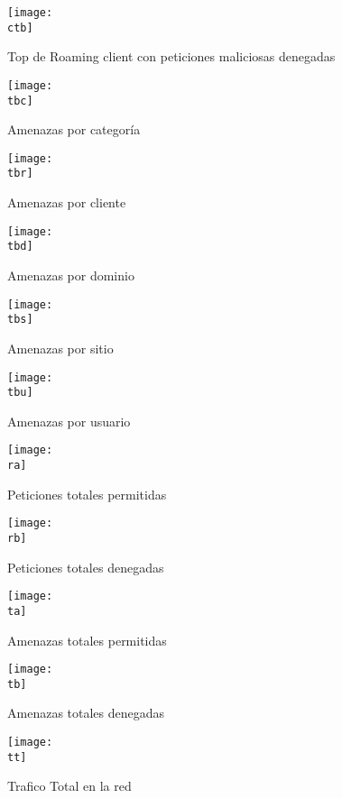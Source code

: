 \documentclass[a4paper]{article}
\newcommand{\ctb}{img/client-threat-block.png}
\newcommand{\tbc}{img/threats-category.pdf}
\newcommand{\tbd}{img/threats-domain.pdf}
\newcommand{\tbr}{img/threats-client.pdf}
\newcommand{\tbs}{img/threats-site.pdf}
\newcommand{\tbu}{img/threats-user.pdf}
\newcommand{\ra}{img/requestAllow.png}
\newcommand{\rb}{img/requestBlock.png}
\newcommand{\ta}{img/threatAllow.png}
\newcommand{\tb}{img/threatBlock.png}
\newcommand{\tt}{img/traficoTotal.png}
\begin{document}
    \begin{figure}[H]
        \centering
        \texttt{[image: \\ctb]}
        \caption{Top de Roaming client con peticiones maliciosas denegadas}
    \end{figure}

    \begin{figure}[H]
        \centering
        \texttt{[image: \\tbc]}
        \caption{Amenazas por categoría}
    \end{figure}

    \begin{figure}[H]
        \centering
        \texttt{[image: \\tbr]}
        \caption{Amenazas por cliente}
    \end{figure}   

    \begin{figure}[H]
        \centering
        \texttt{[image: \\tbd]}
        \caption{Amenazas por dominio}
    \end{figure}    
    
    \begin{figure}[H]
        \centering
        \texttt{[image: \\tbs]}
        \caption{Amenazas por sitio}
    \end{figure}

    \begin{figure}[H]
        \centering
        \texttt{[image: \\tbu]}
        \caption{Amenazas por usuario}
    \end{figure}
    
    \begin{figure}[H]
        \centering
        \texttt{[image: \\ra]}
        \caption{Peticiones totales permitidas}
    \end{figure}
    
    \begin{figure}[H]
        \centering
        \texttt{[image: \\rb]}
        \caption{Peticiones totales denegadas}
    \end{figure}

    \begin{figure}[H]
        \centering
        \texttt{[image: \\ta]}
        \caption{Amenazas totales permitidas}
    \end{figure}

    \begin{figure}[H]
        \centering
        \texttt{[image: \\tb]}
        \caption{Amenazas totales denegadas}
    \end{figure}
    
    \begin{figure}[H]
        \centering
        \texttt{[image: \\tt]}
        \caption{Trafico Total en la red}
    \end{figure} 
    
\end{document}
